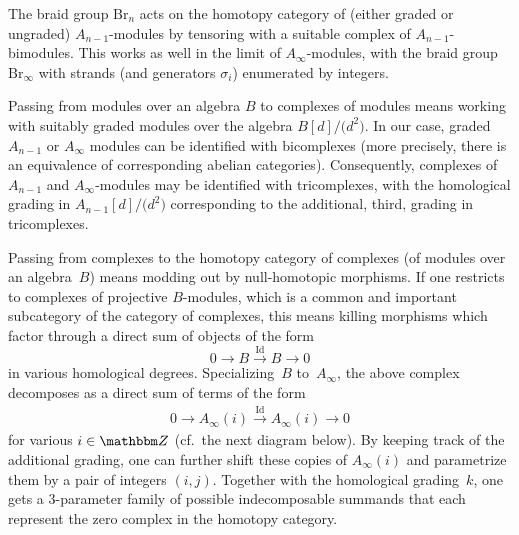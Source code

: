 \documentclass[10pt,a4paper]{amsart}
\theoremstyle{definition}
\numberwithin{equation}{section}
\def\Z{{\mathbbm Z}}
\def\lra{{\longrightarrow}}
\begin{document}
The braid group $\mathrm{Br}_n$ acts on the homotopy category of (either graded or ungraded) $A_{n-1}$-modules by tensoring with a suitable complex of $A_{n-1}$-bimodules. This works as well in the limit of $A_{\infty}$-modules, with the braid group $\mathrm{Br}_\infty$ with strands (and generators $\sigma_i$) enumerated by integers.

Passing from modules over an algebra $B$ to complexes of modules means working with suitably graded modules over the algebra $B[d]/\big(d^2\big)$. In our case, graded $A_{n-1}$ or $A_{\infty}$ modules can be identified with bicomplexes (more precisely, there is an equivalence of corresponding abelian categories). Consequently, complexes of
$A_{n-1}$ and $A_{\infty}$-modules may be identified with tricomplexes, with the homological
grading in $A_{n-1}[d]/\big(d^2\big)$ corresponding to the additional,
third, grading in tricomplexes.

Passing from complexes to the homotopy category of complexes (of modules over an algebra~$B$) means modding out by null-homotopic morphisms. If one restricts to complexes of projective $B$-modules, which is a common and important subcategory of the category of complexes, this means killing morphisms which factor through a direct sum of objects of the form
\[
0 \lra B \stackrel{\mathrm{Id}}{\lra} B \lra 0
\]
in various homological degrees. Specializing~$B$ to~$A_{\infty}$, the above complex decomposes as a direct sum of terms of the form
\begin{gather}\label{exact-comp}
 0 \lra A_{\infty}(i) \stackrel{\mathrm{Id}}{\lra} A_{\infty}(i) \lra 0
\end{gather}
for various $i\in \Z$ (cf.\ the next diagram below). By keeping track of the additional grading, one can further shift these copies of $A_{\infty}(i)$ and parametrize them by a pair of integers $(i,j)$. Together with the homological grading~$k$, one gets a 3-parameter family of possible indecomposable summands that each represent the zero complex in the homotopy category.
\end{document}
